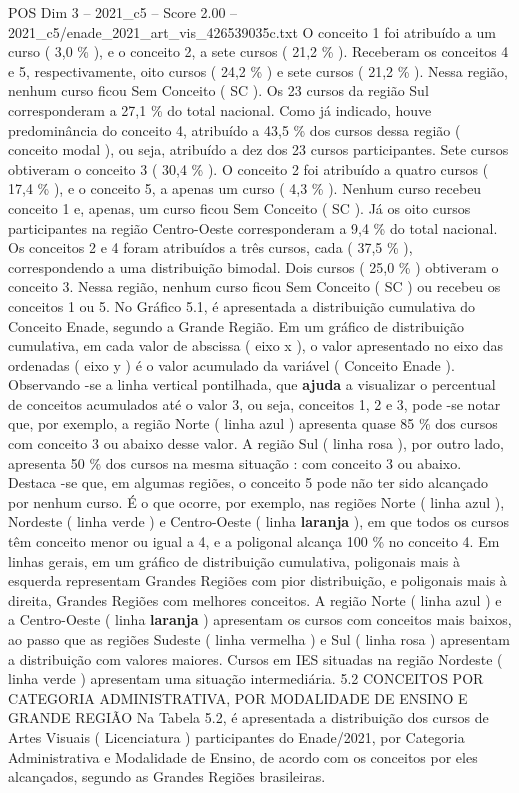 \begin{textsample}{POS Dim 3 – 2021\_c5 – Score 2.00 – 2021\_c5/enade\_2021\_art\_vis\_426539035c.txt}
O conceito 1 foi atribuído a um curso ( 3,0 \% ), e o conceito 2, a sete cursos ( 21,2 \% ).
Receberam os conceitos 4 e 5, respectivamente, oito cursos ( 24,2 \% ) e sete cursos ( 21,2 \% ).
Nessa região, nenhum curso ficou Sem Conceito ( SC ).
Os 23 cursos da região Sul corresponderam a 27,1 \% do total nacional.
Como já indicado, houve predominância do conceito 4, atribuído a 43,5 \% dos cursos dessa região ( conceito modal ), ou seja, atribuído a dez dos 23 cursos participantes.
Sete cursos obtiveram o conceito 3 ( 30,4 \% ).
O conceito 2 foi atribuído a quatro cursos ( 17,4 \% ), e o conceito 5, a apenas um curso ( 4,3 \% ).
Nenhum curso recebeu conceito 1 e, apenas, um curso ficou Sem Conceito ( SC ).
Já os oito cursos participantes na região Centro-Oeste corresponderam a 9,4 \% do total nacional.
Os conceitos 2 e 4 foram atribuídos a três cursos, cada ( 37,5 \% ), correspondendo a uma distribuição bimodal.
Dois cursos ( 25,0 \% ) obtiveram o conceito 3.
Nessa região, nenhum curso ficou Sem Conceito ( SC ) ou recebeu os conceitos 1 ou 5.
No Gráfico 5.1, é apresentada a distribuição cumulativa do Conceito Enade, segundo a Grande Região.
Em um gráfico de distribuição cumulativa, em cada valor de abscissa ( eixo x ), o valor apresentado no eixo das ordenadas ( eixo y ) é o valor acumulado da variável ( Conceito Enade ).
Observando -se a linha vertical pontilhada, que \textbf{ajuda} a visualizar o percentual de conceitos acumulados até o valor 3, ou seja, conceitos 1, 2 e 3, pode -se notar que, por exemplo, a região Norte ( linha azul ) apresenta quase 85 \% dos cursos com conceito 3 ou abaixo desse valor.
A região Sul ( linha rosa ), por outro lado, apresenta 50 \% dos cursos na mesma situação : com conceito 3 ou abaixo.
Destaca -se que, em algumas regiões, o conceito 5 pode não ter sido alcançado por nenhum curso.
É o que ocorre, por exemplo, nas regiões Norte ( linha azul ), Nordeste ( linha verde ) e Centro-Oeste ( linha \textbf{laranja} ), em que todos os cursos têm conceito menor ou igual a 4, e a poligonal alcança 100 \% no conceito 4.
Em linhas gerais, em um gráfico de distribuição cumulativa, poligonais mais à esquerda representam Grandes Regiões com pior distribuição, e poligonais mais à direita, Grandes Regiões com melhores conceitos.
A região Norte ( linha azul ) e a Centro-Oeste ( linha \textbf{laranja} ) apresentam os cursos com conceitos mais baixos, ao passo que as regiões Sudeste ( linha vermelha ) e Sul ( linha rosa ) apresentam a distribuição com valores maiores.
Cursos em IES situadas na região Nordeste ( linha verde ) apresentam uma situação intermediária. 5.2 CONCEITOS POR CATEGORIA ADMINISTRATIVA, POR MODALIDADE DE ENSINO E GRANDE REGIÃO Na Tabela 5.2, é apresentada a distribuição dos cursos de Artes Visuais ( Licenciatura ) participantes do Enade/2021, por Categoria Administrativa e Modalidade de Ensino, de acordo com os conceitos por eles alcançados, segundo as Grandes Regiões brasileiras.

\end{textsample}
